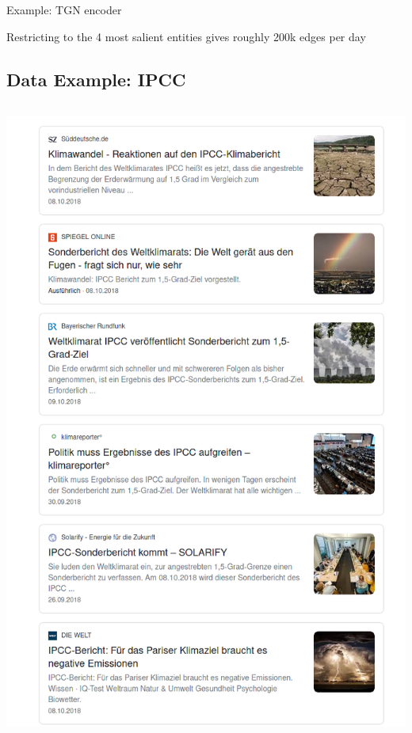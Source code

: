 \documentclass[
  8pt,
  ignorenonframetext,
  aspectratio=43,
]{beamer}
\begin{document}
\begin{frame}[fragile]{Example: TGN encoder}
{  Restricting to the 4 most salient entities gives roughly 200k edges
  per day

  \hypertarget{data-example-ipcc}{%
  \subsection{Data Example: IPCC}\label{data-example-ipcc}}

  \begin{columns}[T]
  \begin{column}{0.48\textwidth}
  \includegraphics{ipcc_headlines.png}
  \end{column}


\end{columns}}
\end{frame}
\end{document}
